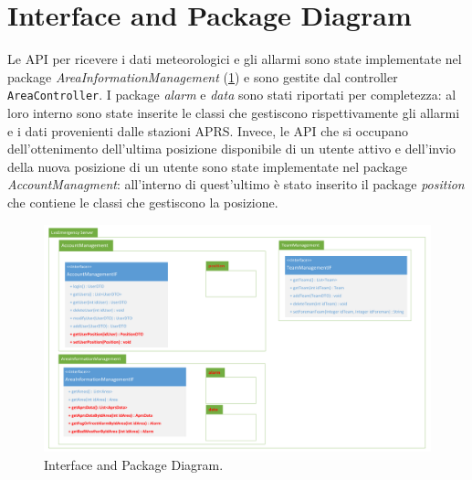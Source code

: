 \clearpage

\section{Interface and Package Diagram}
Le API per ricevere i dati meteorologici e gli allarmi sono state implementate nel package \textit{AreaInformationManagement} (\Fig\ref{fig:InterfaceDiagram_iterazione3}) e sono gestite dal controller \texttt{AreaController}. I package \textit{alarm} e \textit{data} sono stati riportati per completezza: al loro interno sono state inserite le classi che gestiscono rispettivamente gli allarmi e i dati provenienti dalle stazioni APRS. Invece, le API che si occupano dell'ottenimento dell'ultima posizione disponibile di un utente attivo e dell'invio della nuova posizione di un utente sono state implementate nel package \textit{AccountManagment}: all'interno di quest'ultimo è stato inserito il package \textit{position} che contiene le classi che gestiscono la posizione.

\begin{figure}[h!]
	\centering
	\includegraphics[width=0.8\linewidth]{./Iterazione 3/OtherFiles/UML - Interface Diagram}
	\caption{Interface and Package Diagram.}
\label{fig:InterfaceDiagram_iterazione3}
\end{figure}